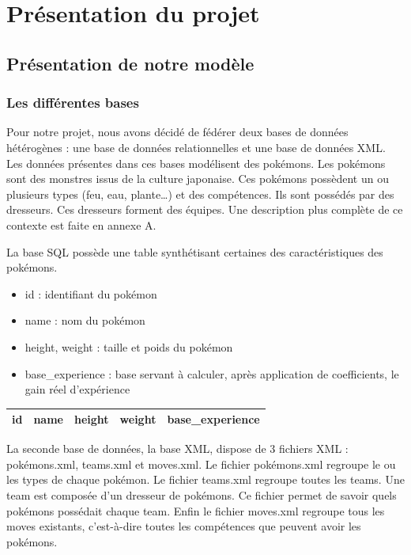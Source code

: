 \section{Présentation du projet}

\subsection{Présentation de notre modèle}

\subsubsection{Les différentes bases}

Pour notre projet, nous avons décidé de fédérer deux bases de données hétérogènes : une base de données relationnelles et une base de données XML. Les données présentes dans ces bases modélisent des pokémons. Les pokémons sont des monstres issus de la culture japonaise. Ces pokémons possèdent un ou plusieurs types (feu, eau, plante…) et des compétences. Ils sont possédés par des dresseurs. Ces dresseurs forment des équipes. Une description plus complète de ce contexte est faite en annexe A.

La base SQL possède une table synthétisant certaines des caractéristiques des pokémons.
\begin{itemize}
\item id : identifiant du pokémon	
\item name : nom du pokémon	
\item height, weight : taille et poids du pokémon	
\item base\_experience : base servant à calculer, après application de coefficients, le gain réel d'expérience
\end{itemize}

\begin{tabular}{|c|c|c|c|c|}
 \hline
 id & name & height & weight & base\_experience \\
 \hline
\end{tabular}

La seconde base de données, la base XML, dispose de 3 fichiers XML : pokémons.xml, teams.xml et moves.xml. Le fichier pokémons.xml regroupe le ou les types de chaque pokémon. Le fichier teams.xml regroupe toutes les teams. Une team est composée d'un dresseur de pokémons. Ce fichier permet de savoir quels pokémons possédait chaque team. Enfin le fichier moves.xml regroupe tous les moves existants, c'est-à-dire toutes les compétences que peuvent avoir les pokémons.

